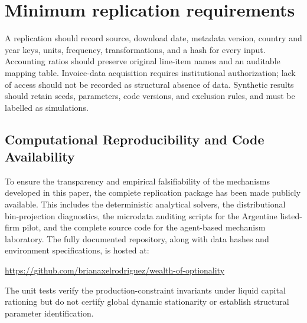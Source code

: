 \documentclass[11pt,a4paper]{article}
\begin{document}
\section{Minimum replication requirements}
A replication should record source, download date, metadata version, country and year keys, units, frequency, transformations, and a hash for every input. Accounting ratios should preserve original line-item names and an auditable mapping table. Invoice-data acquisition requires institutional authorization; lack of access should not be recorded as structural absence of data. Synthetic results should retain seeds, parameters, code versions, and exclusion rules, and must be labelled as simulations.
\subsection{Computational Reproducibility and Code Availability}
To ensure the transparency and empirical falsifiability of the mechanisms developed in this paper, the complete replication package has been made publicly available. This includes the deterministic analytical solvers, the distributional bin-projection diagnostics, the microdata auditing scripts for the Argentine listed-firm pilot, and the complete source code for the agent-based mechanism laboratory. The fully documented repository, along with data hashes and environment specifications, is hosted at:
\begin{center}
    \url{https://github.com/brianaxelrodriguez/wealth-of-optionality}
\end{center}
The unit tests verify the production-constraint invariants under liquid capital rationing but do not certify global dynamic stationarity or establish structural parameter identification.
\end{document}
